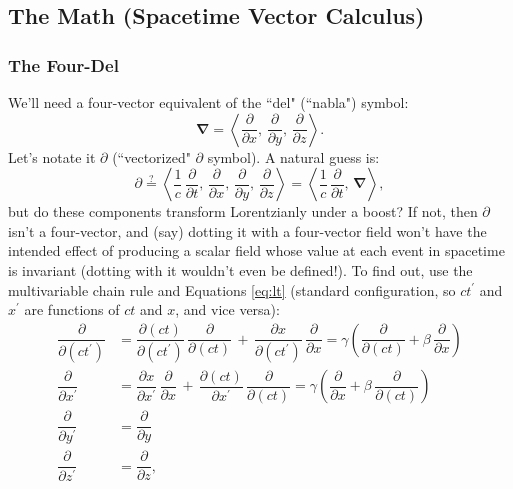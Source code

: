 \documentclass[12pt]{article}
\newcommand{\del}{\boldsymbol{\nabla}}
\begin{document}
\subsection{The Math (Spacetime Vector Calculus)}


\subsubsection{The Four-Del}\label{sssec:fd}

We'll need a four-vector equivalent of the ``del" (``nabla") symbol:
\begin{equation*}
\del = \left \langle \dfrac{\partial}{\partial x}, \, \dfrac{\partial}{\partial y}, \, \dfrac{\partial}{\partial z} \right \rangle .
\end{equation*}
Let's notate it $\partialup$ (``vectorized" $\partial$ symbol). A natural guess is:
\begin{equation*}
\partialup \stackrel{?}{=} \left \langle \dfrac{1}{c} \, \dfrac{\partial}{\partial t} , \, \dfrac{\partial}{\partial x}, \, \dfrac{\partial}{\partial y}, \, \dfrac{\partial}{\partial z} \right \rangle = \left \langle \dfrac{1}{c} \, \dfrac{\partial}{\partial t} , \, \del \right \rangle ,
\end{equation*}
but do these components transform Lorentzianly under a boost? If not, then $\partialup$ isn't a four-vector, and (say) dotting it with a four-vector field won't have the intended effect of producing a scalar field whose value at each event in spacetime is invariant (dotting with it wouldn't even be defined!). To find out, use the multivariable chain rule and Equations \ref{eq:lt} (standard configuration, so $ct^\prime$ and $x^\prime$ are functions of $ct$ and $x$, and vice versa):
\begin{equation*}
\begin{split}
\dfrac{\partial}{\partial (ct^\prime)} &= \dfrac{\partial (ct)}{\partial (ct^\prime)} \, \dfrac{\partial}{\partial (ct)} \, + \, \dfrac{\partial x}{\partial (ct^\prime)} \, \dfrac{\partial}{\partial x} = \gamma \left( \dfrac{\partial}{\partial (ct)} + \beta \, \dfrac{\partial}{\partial x} \right) \\[3pt]
\dfrac{\partial}{\partial x^\prime} &= \dfrac{\partial x}{\partial x^\prime} \, \dfrac{\partial}{\partial x} \, + \, \dfrac{\partial (ct)}{\partial x^\prime} \, \dfrac{\partial}{\partial (ct)}  = \gamma \left( \dfrac{\partial}{\partial x} + \beta \, \dfrac{\partial}{\partial (ct)}  \right) \\[3pt]
\dfrac{\partial}{\partial y^\prime} &= \dfrac{\partial}{\partial y} \\[3pt]
\dfrac{\partial}{\partial z^\prime} &= \dfrac{\partial}{\partial z} ,
\end{split}
\end{equation*}
\end{document}

